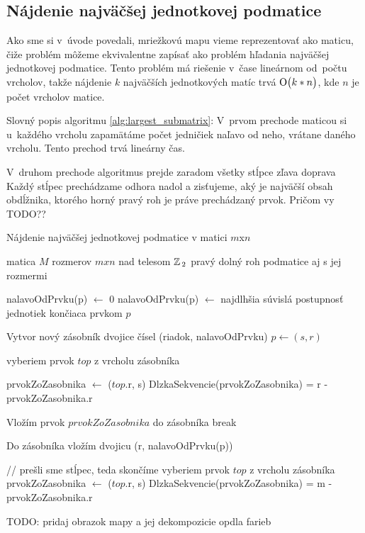 \subsection{Nájdenie najväčšej jednotkovej podmatice}
Ako sme si v~úvode povedali, mriežkovú mapu vieme reprezentovať ako maticu, čiže
problém môžeme ekvivalentne zapísať ako problém hľadania najväčšej jednotkovej podmatice.
Tento problém má riešenie v~čase lineárnom od~počtu vrcholov, takže nájdenie $k$ najväčších
jednotkových matíc trvá $\operatorname{O}\bigl(k*n\bigr)$, kde $n$ je počet vrcholov matice.

Slovný popis algoritmu \ref{alg:largest_submatrix}: 
V~prvom prechode maticou si u~každého vrcholu zapamätáme počet jedničiek naľavo od neho, vrátane daného vrcholu. 
Tento prechod trvá lineárny čas.

V~druhom prechode algoritmus prejde zaradom všetky stĺpce zľava doprava
Každý stĺpec prechádzame odhora nadol a zisťujeme, aký je najväčší obsah obdĺžnika, ktorého horný pravý roh je práve prechádzaný prvok.
Pričom vy TODO??


\begin{algorithm}
\caption{Nájdenie najväčšej jednotkovej podmatice v matici  $m$x$n$}
\label{alg:largest_submatrix}
\begin{algorithmic}[1] %
\REQUIRE matica $M$ rozmerov $m x n$ nad telesom $\mathbb{Z}\,_2$
\ENSURE pravý dolný roh podmatice aj s jej rozmermi


		\STATE nalavoOdPrvku(p) $\leftarrow$ 0
	\ELSE
		\STATE nalavoOdPrvku(p) $\leftarrow$ najdlhšia súvislá postupnosť jednotiek končiaca prvkom $p$
	\ENDIF	
\ENDFOR

	\STATE Vytvor nový zásobník dvojice čísel (riadok, nalavoOdPrvku)
		\STATE $p \leftarrow (s, r)$
		
			\STATE vyberiem prvok $top$ z vrcholu zásobníka
						
				\STATE prvokZoZasobnika $\leftarrow$ ($top$.r, s)
				\STATE DlzkaSekvencie(prvokZoZasobnika) = r - prvokZoZasobnika.r
			
			\ELSE
				\STATE Vložím prvok $prvokZoZasobnika$ do zásobníka
				\STATE break
			\ENDIF
		\ENDWHILE
		
		\STATE Do zásobníka vložím dvojicu (r, nalavoOdPrvku(p))
	\ENDFOR
	
	\STATE // prešli sme stĺpec, teda skončíme
		\STATE vyberiem prvok $top$ z vrcholu zásobníka
		\STATE prvokZoZasobnika $\leftarrow$ ($top$.r, s)
		\STATE DlzkaSekvencie(prvokZoZasobnika) = m - prvokZoZasobnika.r
		
	\ENDWHILE
\ENDFOR




\end{algorithmic}
\end{algorithm}



TODO: pridaj obrazok mapy a jej dekompozicie opdla farieb